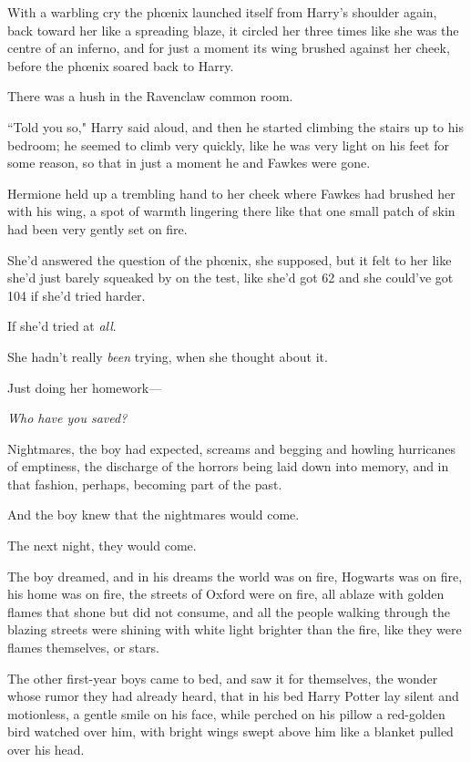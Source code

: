 With a warbling cry the phœnix launched itself from Harry's shoulder again, back toward her like a spreading blaze, it circled her three times like she was the centre of an inferno, and for just a moment its wing brushed against her cheek, before the phœnix soared back to Harry.

There was a hush in the Ravenclaw common room.

``Told you so," Harry said aloud, and then he started climbing the stairs up to his bedroom; he seemed to climb very quickly, like he was very light on his feet for some reason, so that in just a moment he and Fawkes were gone.

Hermione held up a trembling hand to her cheek where Fawkes had brushed her with his wing, a spot of warmth lingering there like that one small patch of skin had been very gently set on fire.

She'd answered the question of the phœnix, she supposed, but it felt to her like she'd just barely squeaked by on the test, like she'd got 62 and she could've got 104 if she'd tried harder.

If she'd tried at \emph{all}.

She hadn't really \emph{been} trying, when she thought about it.

Just doing her homework—

\emph{Who have you saved?}


Nightmares, the boy had expected, screams and begging and howling hurricanes of emptiness, the discharge of the horrors being laid down into memory, and in that fashion, perhaps, becoming part of the past.

And the boy knew that the nightmares would come.

The next night, they would come.

The boy dreamed, and in his dreams the world was on fire, Hogwarts was on fire, his home was on fire, the streets of Oxford were on fire, all ablaze with golden flames that shone but did not consume, and all the people walking through the blazing streets were shining with white light brighter than the fire, like they were flames themselves, or stars.

The other first-year boys came to bed, and saw it for themselves, the wonder whose rumor they had already heard, that in his bed Harry Potter lay silent and motionless, a gentle smile on his face, while perched on his pillow a red-golden bird watched over him, with bright wings swept above him like a blanket pulled over his head.

